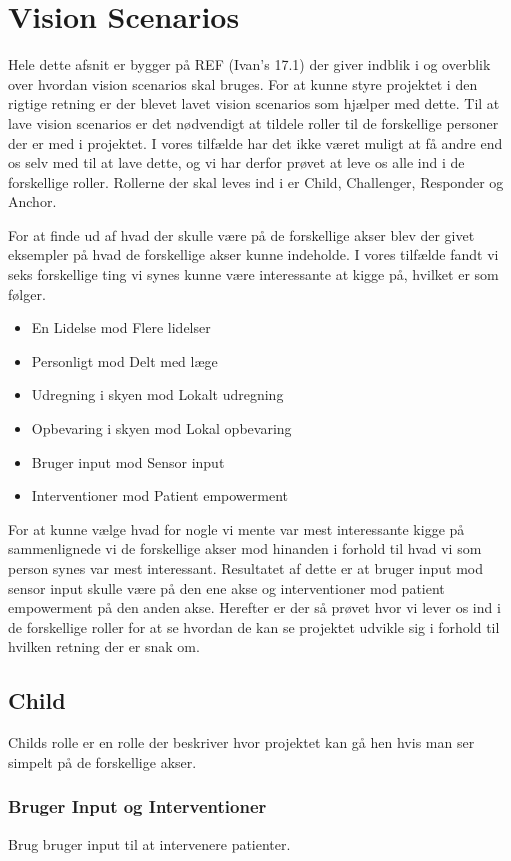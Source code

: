 \section{Vision Scenarios}
Hele dette afsnit er bygger på REF (Ivan's 17.1) der giver indblik i og overblik over hvordan vision scenarios skal bruges.
For at kunne styre projektet i den rigtige retning er der blevet lavet vision scenarios som hjælper med dette.
Til at lave vision scenarios er det nødvendigt at tildele roller til de forskellige personer der er med i projektet.
I vores tilfælde har det ikke været muligt at få andre end os selv med til at lave dette, og vi har derfor prøvet at leve os alle ind i de forskellige roller.
Rollerne der skal leves ind i er Child, Challenger, Responder og Anchor.

For at finde ud af hvad der skulle være på de forskellige akser blev der givet eksempler på hvad de forskellige akser kunne indeholde.
I vores tilfælde fandt vi seks forskellige ting vi synes kunne være interessante at kigge på, hvilket er som følger.
\begin{itemize}
	\item En Lidelse mod Flere lidelser
	\item Personligt mod Delt med læge
	\item Udregning i skyen mod Lokalt udregning
	\item Opbevaring i skyen mod Lokal opbevaring
	\item Bruger input mod Sensor input
	\item Interventioner mod Patient empowerment
\end{itemize}

For at kunne vælge hvad for nogle vi mente var mest interessante kigge på sammenlignede vi de forskellige akser mod hinanden i forhold til hvad vi som person synes var mest interessant.
Resultatet af dette er at bruger input mod sensor input skulle være på den ene akse og interventioner mod patient empowerment på den anden akse.
Herefter er der så prøvet hvor vi lever os ind i de forskellige roller for at se hvordan de kan se projektet udvikle sig i forhold til hvilken retning der er snak om.

\subsection{Child}
Childs rolle er en rolle der beskriver hvor projektet kan gå hen hvis man ser simpelt på de forskellige akser.

\subsubsection*{Bruger Input og Interventioner}
Brug bruger input til at intervenere patienter.
